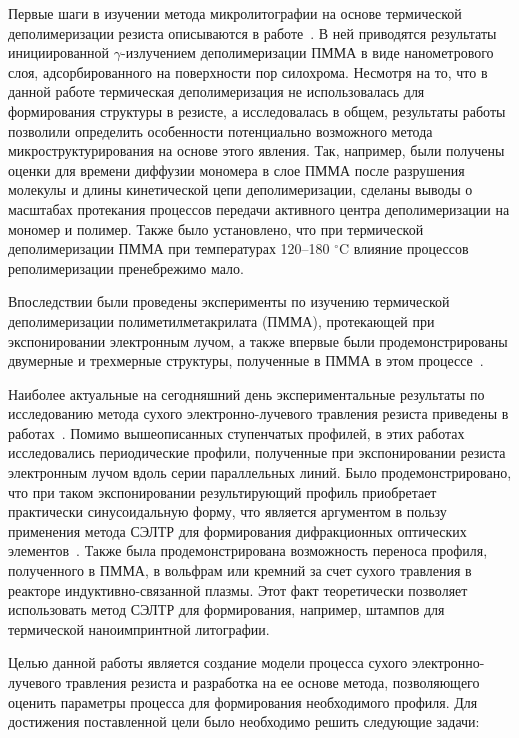 \previouswork

Первые шаги в изучении метода микролитографии на основе термической деполимеризации резиста описываются в работе~\cite{Bruk_2000}. В ней приводятся результаты инициированной $\gamma$-излучением деполимеризации ПММА в виде нанометрового слоя, адсорбированного на поверхности пор силохрома. Несмотря на то, что в данной работе термическая деполимеризация не использовалась для формирования структуры в резисте, а исследовалась в общем, результаты работы позволили определить особенности потенциально возможного метода микроструктурирования на основе этого явления. Так, например, были получены оценки для времени диффузии мономера в слое ПММА после разрушения молекулы и длины кинетической цепи деполимеризации, сделаны выводы о масштабах протекания процессов передачи активного центра деполимеризации на мономер и полимер. Также было установлено, что при термической деполимеризации ПММА при температурах 120--180 $^\circ$C влияние процессов реполимеризации пренебрежимо мало.

Впоследствии были проведены эксперименты по изучению термической деполимеризации полиметилметакрилата (ПММА), протекающей при экспонировании электронным лучом, а также впервые были продемонстрированы двумерные и трехмерные структуры, полученные в ПММА в этом процессе~\cite{Bruk_2013}.

Наиболее актуальные на сегодняшний день экспериментальные результаты по исследованию метода сухого электронно-лучевого травления резиста приведены в работах~\cite{Bruk_2015_co, Bruk_2016_mee}. Помимо вышеописанных ступенчатых профилей, в этих работах исследовались периодические профили, полученные при экспонировании резиста электронным лучом вдоль серии параллельных линий. Было продемонстрировано, что при таком экспонировании результирующий профиль приобретает практически синусоидальную форму, что является аргументом в пользу применения метода СЭЛТР для формирования дифракционных оптических элементов~\cite{Mitreska_sin_gratings}. Также была продемонстрирована возможность переноса профиля, полученного в ПММА, в вольфрам или кремний за счет сухого травления в реакторе индуктивно-связанной плазмы. Этот факт теоретически позволяет использовать метод СЭЛТР для формирования, например, штампов для термической наноимпринтной литографии.


\aimsandtasks

Целью данной работы является создание модели процесса сухого электронно-лучевого травления резиста и разработка на ее основе метода, позволяющего оценить параметры процесса для формирования необходимого профиля. Для достижения поставленной цели было необходимо решить следующие задачи:

